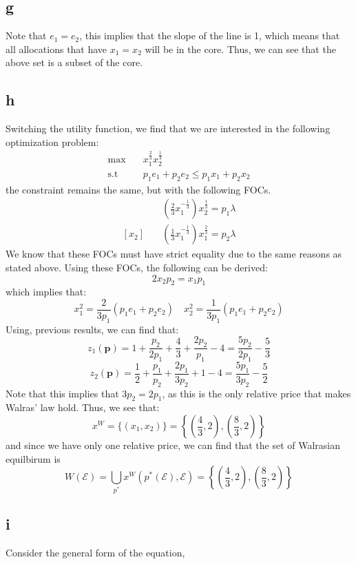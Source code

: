 \documentclass[11pt]{article}
\newcommand{\st}{\text{s.t}}
\begin{document}
\subsection*{g}
Note that $e_1 = e_2$, this implies that the slope of the line is 1, which means that all allocations that have $x_1 = x_2$ will be in the core. Thus, we can see that the above set is a subset of the core. 
\subsection*{h}
Switching the utility function, we find that we are interested in the following optimization problem:
\begin{align*}
    \max & \quad x_1^{\frac{2}{3}}x_2^{\frac{1}{3}}\\
    \st & \quad p_1e_1 + p_2e_2 \leq p_1 x_1 + p_2x_2 
\end{align*}
the constraint remains the same, but with the following FOCs. 
\begin{align*}
    [x_1] & \quad \left( \frac{2}{3} x_1^{-\frac{1}{3}} \right)x_2^\frac{1}{3} = p_1 \lambda\\
    [x_2] & \quad \left( \frac{1}{3}x_1^{-\frac{1}{3}} \right)x_1^\frac{2}{3} = p_2 \lambda
\end{align*}
We know that these FOCs must have strict equality due to the same reasons as stated above. Using these FOCs, the following can be derived:
\[
2x_2p_2 = x_1p_1
\]
which implies that:
\[
x_1^2 = \frac{2}{3p_1} (p_1e_1 + p_2e_2) \quad x_2^2 = \frac{1}{3p_1}(p_1e_1 + p_2e_2)
\]
Using, previous results, we can find that:
\[
z_1(\mathbf{p}) = 1 + \frac{p_2}{2p_1} + \frac{4}{3} + \frac{2p_2}{p_1} - 4 = \frac{5p_2}{2p_1} - \frac{5}{3}
\]
\[
z_2(\mathbf{p}) = \frac{1}{2} + \frac{p_1}{p_2} + \frac{2p_1}{3p_2} + 1 -4 = \frac{5p_1}{3p_2} - \frac{5}{2}
\]
Note that this implies that $3p_2 = 2 p_1$, as this is the only relative price that makes Walras' law hold. Thus, we see that:
\[
x^W = \{(x_1, x_2)\} = \left\{ \left( \frac{4}{3}, 2 \right), \left( \frac{8}{3}, 2 \right)\right\}
\]
and since we have only one relative price, we can find that the set of Walrasian equilbirum is 
\[
    W(\mathcal{E}) = \bigcup_{p^*} x^W(p^*(\mathcal{E}), \mathcal{E})  =  \left\{ \left( \frac{4}{3}, 2 \right), \left( \frac{8}{3}, 2 \right)\right\}
\]
\subsection*{i}
Consider the general form of the equation,
\section{}
\end{document}
